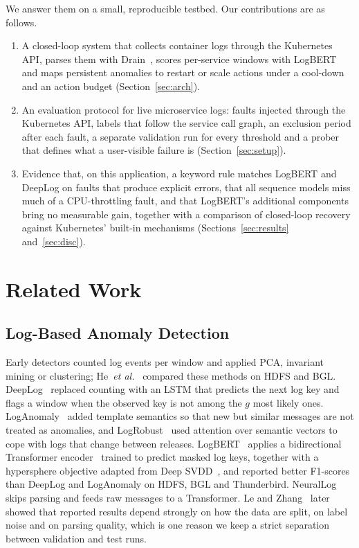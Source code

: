 \documentclass[journal]{IEEEtran}
\begin{document}
We answer them on a small, reproducible testbed. Our contributions are as follows.
\begin{enumerate}
\item A closed-loop system that collects container logs through the Kubernetes API, parses them with Drain~\cite{he2017}, scores per-service windows with LogBERT and maps persistent anomalies to restart or scale actions under a cool-down and an action budget (Section~\ref{sec:arch}).
\item An evaluation protocol for live microservice logs: faults injected through the Kubernetes API, labels that follow the service call graph, an exclusion period after each fault, a separate validation run for every threshold and a prober that defines what a user-visible failure is (Section~\ref{sec:setup}).
\item Evidence that, on this application, a keyword rule matches LogBERT and DeepLog on faults that produce explicit errors, that all sequence models miss much of a CPU-throttling fault, and that LogBERT's additional components bring no measurable gain, together with a comparison of closed-loop recovery against Kubernetes' built-in mechanisms (Sections~\ref{sec:results} and~\ref{sec:disc}).
\end{enumerate}

\section{Related Work}
\subsection{Log-Based Anomaly Detection}
Early detectors counted log events per window and applied PCA, invariant mining or clustering; He~\textit{et al.}~\cite{he2016} compared these methods on HDFS and BGL. DeepLog~\cite{du2017} replaced counting with an LSTM that predicts the next log key and flags a window when the observed key is not among the $g$ most likely ones. LogAnomaly~\cite{meng2019} added template semantics so that new but similar messages are not treated as anomalies, and LogRobust~\cite{zhang2019} used attention over semantic vectors to cope with logs that change between releases. LogBERT~\cite{guo2021} applies a bidirectional Transformer encoder~\cite{vaswani2017,devlin2019} trained to predict masked log keys, together with a hypersphere objective adapted from Deep SVDD~\cite{ruff2018}, and reported better F1-scores than DeepLog and LogAnomaly on HDFS, BGL and Thunderbird. NeuralLog~\cite{le2021} skips parsing and feeds raw messages to a Transformer. Le and Zhang~\cite{le2022} later showed that reported results depend strongly on how the data are split, on label noise and on parsing quality, which is one reason we keep a strict separation between validation and test runs.
\end{document}
